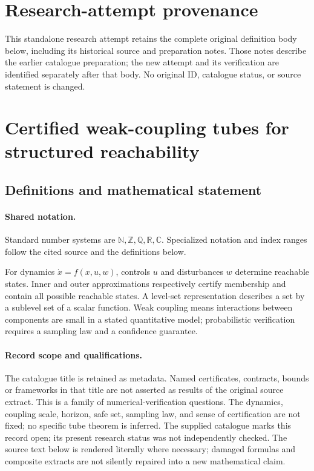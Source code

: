 \documentclass[11pt]{article}
\begin{document}
\section*{Research-attempt provenance}
This standalone research attempt retains the complete original definition body below,
including its historical source and preparation notes. Those notes describe the
earlier catalogue preparation; the new attempt and its verification are identified
separately after that body. No original ID, catalogue status, or source statement is changed.

\section{Certified weak-coupling tubes for structured reachability}\label{statement}

\subsection{Definitions and mathematical statement}

\paragraph{Shared notation.}Standard number systems are $\mathbb N,\mathbb Z,\mathbb Q,\mathbb R,\mathbb C$. Specialized notation and index ranges follow the cited source and the definitions below.


For dynamics $\dot x=f(x,u,w)$, controls $u$ and disturbances $w$ determine reachable states. Inner and outer approximations respectively certify membership and contain all possible reachable states. A level-set representation describes a set by a sublevel set of a scalar function. Weak coupling means interactions between components are small in a stated quantitative model; probabilistic verification requires a sampling law and a confidence guarantee.
\paragraph{Record scope and qualifications.}
The catalogue title is retained as metadata. Named certificates, contracts, bounds or frameworks in that title are not asserted as results of the original source extract.
This is a family of numerical-verification questions. The dynamics, coupling scale, horizon, safe set, sampling law, and sense of certification are not fixed; no specific tube theorem is inferred. The supplied catalogue marks this record open; its present research status was not independently checked.
The source text below is rendered literally where necessary; damaged formulas and composite extracts are not silently repaired into a new mathematical claim.
\end{document}
